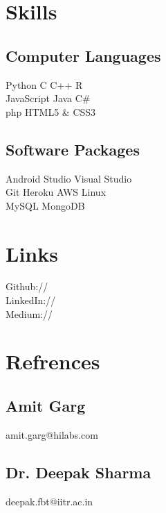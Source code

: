 \documentclass[]{deedy-resume-openfont}
\begin{document}
\begin{minipage}[t]{0.33\textwidth}

\section{Skills}
\subsection{Computer Languages}
Python \textbullet{}   C \textbullet{} C++ \textbullet{} R \\
JavaScript \textbullet{} Java \textbullet{} C\#  \\
php \textbullet{} HTML5 \& CSS3 \\
\sectionsep
\subsection{Software Packages}
Android Studio \textbullet{}   Visual Studio \\
Git \textbullet{} Heroku \textbullet{} AWS \textbullet{} Linux\\ 
MySQL \textbullet{} MongoDB\\

\sectionsep

\section{Links} 
Github:// \href{https://github.com/someshchaturvedi}{} \\
LinkedIn://  \href{https://www.linkedin.com/in/somesh-chaturvedi-997974103/}{} \\
Medium://  \href{https://medium.com/@somesh.08.96}{}
\sectionsep


\section{Refrences}
\subsection{Amit Garg}
amit.garg@hilabs.com
\sectionsep
\subsection{Dr. Deepak Sharma}
deepak.fbt@iitr.ac.in\\
\sectionsep

%
%

\end{minipage} 
\end{document}
